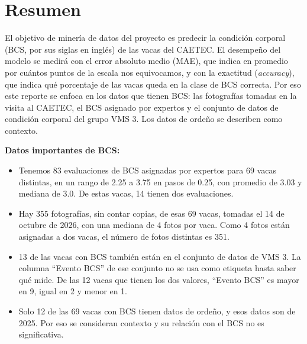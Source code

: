 \section*{Resumen}

El objetivo de minería de datos del proyecto es predecir la condición corporal (BCS, por sus siglas en inglés) de las vacas del CAETEC. El desempeño del modelo se medirá con el error absoluto medio (MAE), que indica en promedio por cuántos puntos de la escala nos equivocamos, y con la exactitud (\textit{accuracy}), que indica qué porcentaje de las vacas queda en la clase de BCS correcta. Por eso este reporte se enfoca en los datos que tienen BCS: las fotografías tomadas en la visita al CAETEC, el BCS asignado por expertos y el conjunto de datos de condición corporal del grupo VMS 3. Los datos de ordeño se describen como contexto.

\textbf{Datos importantes de BCS:}

\begin{itemize}
  \item Tenemos 83 evaluaciones de BCS asignadas por expertos para 69 vacas distintas, en un rango de 2.25 a 3.75 en pasos de 0.25, con promedio de 3.03 y mediana de 3.0. De estas vacas, 14 tienen dos evaluaciones.
  \item Hay 355 fotografías, sin contar copias, de esas 69 vacas, tomadas el 14 de octubre de 2026, con una mediana de 4 fotos por vaca. Como 4 fotos están asignadas a dos vacas, el número de fotos distintas es 351.
  \item 13 de las vacas con BCS también están en el conjunto de datos de VMS 3. La columna ``Evento BCS'' de ese conjunto no se usa como etiqueta hasta saber qué mide. De las 12 vacas que tienen los dos valores, ``Evento BCS'' es mayor en 9, igual en 2 y menor en 1.
  \item Solo 12 de las 69 vacas con BCS tienen datos de ordeño, y esos datos son de 2025. Por eso se consideran contexto y su relación con el BCS no es significativa.
\end{itemize}
